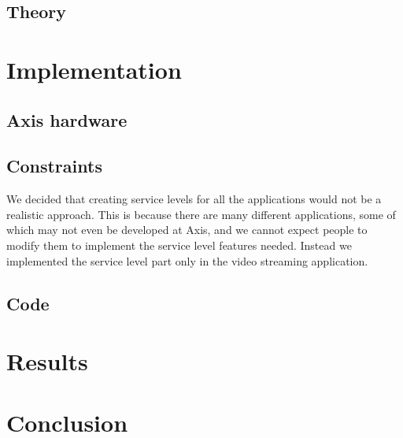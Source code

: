 \documentclass{LTHthesis}
\begin{document}
\section{Theory} %
\chapter{Implementation}
\section{Axis hardware} %
\section{Constraints} %
We decided that creating service levels for all the applications would not be a realistic approach. This is because there are many different applications, some of which may not even be developed at Axis, and we cannot expect people to modify them to implement the service level features needed. Instead we implemented the service level part only in the video streaming application.
\section{Code} 
\chapter{Results}
\chapter{Conclusion}
\printbibliography  %
%
%
\end{document}
